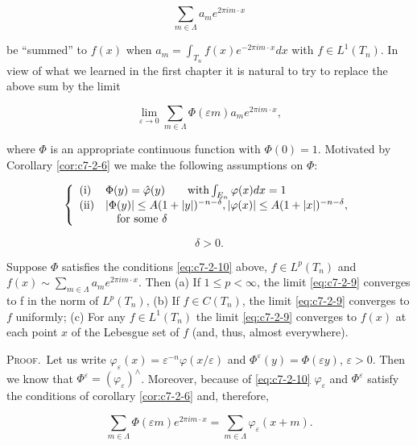 \[
\sum_{m\in\Lambda}a_{m}e^{2\pi i m\cdot x}
\]

be ``summed'' to $f(x)$ when $a_m = \int_{T_n} f(x) e^{-2\pi im \cdot x} dx$ with $f \in L^1(T_n)$. In view of what we learned in the first chapter it is natural to try to replace the above sum by the limit

\begin{equation}\label{eq:c7-2-9}
\lim_{\varepsilon\to0}\sum_{m\in\Lambda}\Phi(\varepsilon m)a_{m}e^{2\pi i m\cdot x},
\end{equation}

where $\Phi$ is an appropriate continuous function with $\Phi(0) = 1$. Motivated by Corollary \eqref{cor:c7-2-6} we make the following assumptions on $\Phi$:

\begin{equation}\label{eq:c7-2-10}
\left\{\begin{array}{l l}{\mathrm{(i)}}&{\Phi(y)=\hat{\varphi}(y)\qquad\text{with}\int_{E_{n}}\varphi(x)d x=1}\\ {\text{(ii)}}&{|\Phi(y)|\leq A(1+|y|)^{-n-\delta},|\varphi(x)|\leq A(1+|x|)^{-n-\delta},}\\ &{\quad\text{for some }\delta}\end{array}\right.
\end{equation}

\[
\delta>0.
\]

\begin{theorem}
\label{thm:c7-2-11}
Suppose $\Phi$ satisfies the conditions \eqref{eq:c7-2-10} above, $f \in L^{p}(T_{n})$ and $f(x) \sim \sum_{m \in \Lambda} a_{m} e^{2\pi i m \cdot x}$. Then
(a) If $1 \leq p < \infty$, the limit \eqref{eq:c7-2-9} converges to f in the norm of $L^p(T_n)$,
(b) If $f \in C(T_n)$, the limit \eqref{eq:c7-2-9} converges to $f$ uniformly;
(c) For any $f \in L^{1}(T_{n})$ the limit \eqref{eq:c7-2-9} converges to $f(x)$ at each point $x$ of the Lebesgue set of $f$ (and, thus, almost everywhere).
\end{theorem}

\textsc{Proof.}\ Let us write $\varphi_{\varepsilon}(x) = \varepsilon^{-n}\varphi(x/\varepsilon)$ and $\Phi^{\varepsilon}(y) = \Phi(\varepsilon y)$, $\varepsilon > 0$. Then we know that $\Phi^{\varepsilon} = (\varphi_{\varepsilon})^{\wedge}$. Moreover, because of \eqref{eq:c7-2-10} $\varphi_{\varepsilon}$ and $\Phi^{\varepsilon}$ satisfy the conditions of corollary \eqref{cor:c7-2-6} and, therefore,

\begin{equation}\label{eq:c7-2-12}
\sum_{m\in\Lambda}\Phi(\varepsilon m)e^{2\pi i m\cdot x}=\sum_{m\in\Lambda}\varphi_{\varepsilon}(x+m).
\end{equation}

